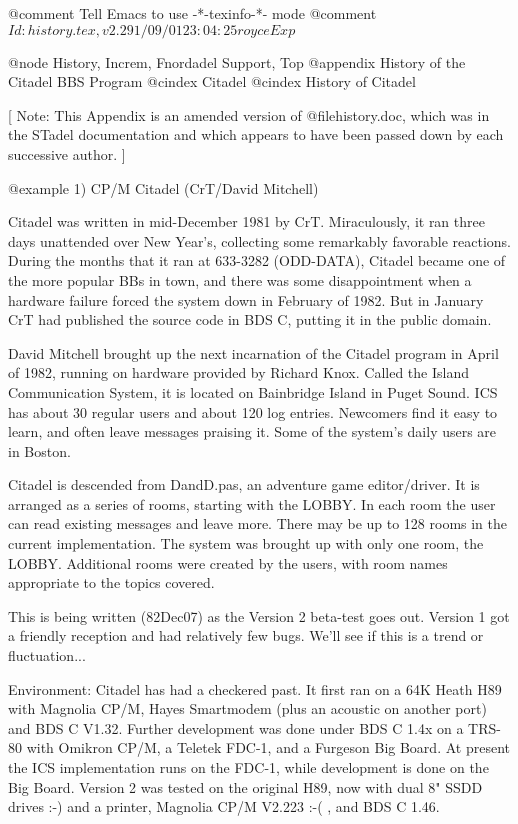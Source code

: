 @comment Tell Emacs to use -*-texinfo-*- mode
@comment $Id: history.tex,v 2.2 91/09/01 23:04:25 royce Exp $

@node History, Increm, Fnordadel Support, Top
@appendix History of the Citadel BBS Program
@cindex Citadel
@cindex History of Citadel

[ Note:  This Appendix is an amended version of @file{history.doc}, which was in
the STadel documentation and which appears to have been passed down by
each successive author. ]

@example
1) CP/M Citadel (CrT/David Mitchell)

Citadel was written in mid-December 1981 by CrT.  Miraculously, it
ran three days unattended over New Year's, collecting some 
remarkably favorable reactions.  During the months that it ran at 
633-3282 (ODD-DATA), Citadel became one of the more popular BBs in
town, and there was some disappointment when a hardware failure 
forced the system down in February of 1982.  But in January CrT
had published the source code in BDS C, putting it in the public
domain.  

David Mitchell brought up the next incarnation of the Citadel 
program in April of 1982, running on hardware provided by Richard 
Knox.  Called the Island Communication System, it is located on 
Bainbridge Island in Puget Sound.  ICS has about 30 regular users 
and about 120 log entries.  Newcomers find it easy to learn, and 
often leave messages praising it.  Some of the system's daily
users are in Boston.  

Citadel is descended from DandD.pas, an adventure game
editor/driver.  It is arranged as a series of rooms, starting with
the LOBBY.  In each room the user can read existing messages and
leave more.  There may be up to 128 rooms in the current
implementation.  The system was brought up with only one room, the
LOBBY.  Additional rooms were created by the users, with room
names appropriate to the topics covered.  

This is being written (82Dec07) as the Version 2 beta-test goes
out.  Version 1 got a friendly reception and had relatively few
bugs.  We'll see if this is a trend or fluctuation...  

Environment:  Citadel has had a checkered past.  It first ran on a
64K Heath H89 with Magnolia CP/M, Hayes Smartmodem (plus an
acoustic on another port) and BDS C V1.32.  Further development
was done under BDS C 1.4x on a TRS-80 with Omikron CP/M, a Teletek
FDC-1, and a Furgeson Big Board.  At present the ICS
implementation runs on the FDC-1, while development is done on the
Big Board.  Version 2 was tested on the original H89, now with
dual 8" SSDD drives :-) and a printer, Magnolia CP/M V2.223 :-( ,
and BDS C 1.46.  

